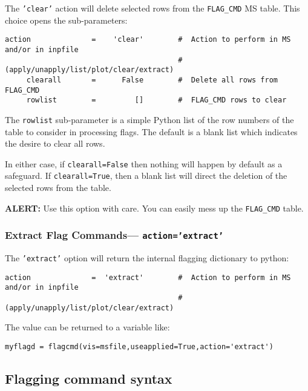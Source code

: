 The {\tt 'clear'} action will delete selected rows from the 
{\tt FLAG\_CMD} MS table.
This choice opens the sub-parameters:
\small
\begin{verbatim}
action              =    'clear'        #  Action to perform in MS and/or in inpfile
                                        #   (apply/unapply/list/plot/clear/extract)
     clearall       =      False        #  Delete all rows from FLAG_CMD
     rowlist        =         []        #  FLAG_CMD rows to clear
\end{verbatim}
\normalsize

The {\tt rowlist} sub-parameter is a simple Python list of the row
numbers of the table to consider in processing flags.  The default is
a blank list which indicates the desire to clear all rows.

In either case, if {\tt clearall=False} then nothing will
happen by default as a safeguard.  If {\tt clearall=True}, then a 
blank list will direct the deletion of the selected rows from the table.

{\bf ALERT:} Use this option with care.  You can easily mess up the
{\tt FLAG\_CMD} table.

\subsubsection{Extract Flag Commands--- {\tt action='extract'}}
\label{section:edit.flagcmd.action.extract}

The {\tt 'extract'} option will return the internal flagging dictionary to
              python:
\small
\begin{verbatim}
action              =  'extract'        #  Action to perform in MS and/or in inpfile
                                        #   (apply/unapply/list/plot/clear/extract)
\end{verbatim}
\normalsize

The value can be returned to a variable like: 

\small
\begin{verbatim}
myflagd = flagcmd(vis=msfile,useapplied=True,action='extract')
\end{verbatim}
\normalsize


\subsection{Flagging command syntax}
\label{section:edit.flagcmd.syntax}


